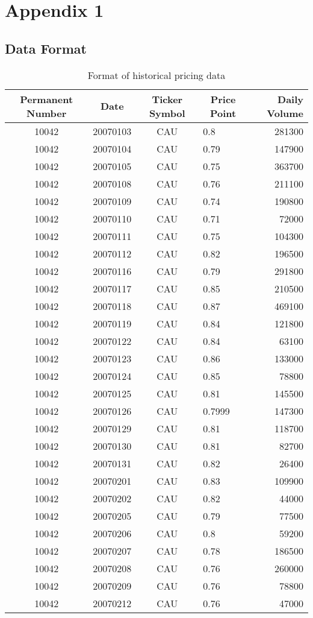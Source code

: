 \chapter{Appendix 1}\label{app1}

\section{Data Format}\label{selectedsecurities}
\begin{table}[p]
\centering
\begin{tabular}{@{}clclr@{}}
\toprule\toprule
Permanent Number & \multicolumn{1}{c}{Date} & Ticker Symbol & \multicolumn{1}{c}{Price Point} & Daily Volume \\\midrule
10042 & 20070103 & CAU & 0.8    & 281300 \\ 
10042 & 20070104 & CAU & 0.79   & 147900 \\
10042 & 20070105 & CAU & 0.75   & 363700 \\
10042 & 20070108 & CAU & 0.76   & 211100 \\
10042 & 20070109 & CAU & 0.74   & 190800 \\
10042 & 20070110 & CAU & 0.71   & 72000  \\
10042 & 20070111 & CAU & 0.75   & 104300 \\
10042 & 20070112 & CAU & 0.82   & 196500 \\
10042 & 20070116 & CAU & 0.79   & 291800 \\
10042 & 20070117 & CAU & 0.85   & 210500 \\
10042 & 20070118 & CAU & 0.87   & 469100 \\
10042 & 20070119 & CAU & 0.84   & 121800 \\
10042 & 20070122 & CAU & 0.84   & 63100  \\
10042 & 20070123 & CAU & 0.86   & 133000 \\
10042 & 20070124 & CAU & 0.85   & 78800  \\
10042 & 20070125 & CAU & 0.81   & 145500 \\
10042 & 20070126 & CAU & 0.7999 & 147300 \\
10042 & 20070129 & CAU & 0.81   & 118700 \\
10042 & 20070130 & CAU & 0.81   & 82700  \\
10042 & 20070131 & CAU & 0.82   & 26400  \\
10042 & 20070201 & CAU & 0.83   & 109900 \\
10042 & 20070202 & CAU & 0.82   & 44000  \\
10042 & 20070205 & CAU & 0.79   & 77500  \\
10042 & 20070206 & CAU & 0.8    & 59200  \\
10042 & 20070207 & CAU & 0.78   & 186500 \\
10042 & 20070208 & CAU & 0.76   & 260000 \\
10042 & 20070209 & CAU & 0.76   & 78800  \\
10042 & 20070212 & CAU & 0.76   & 47000  \\ \bottomrule
\end{tabular}
\caption{Format of historical pricing data}
\label{tab:histPrice}
\end{table}

